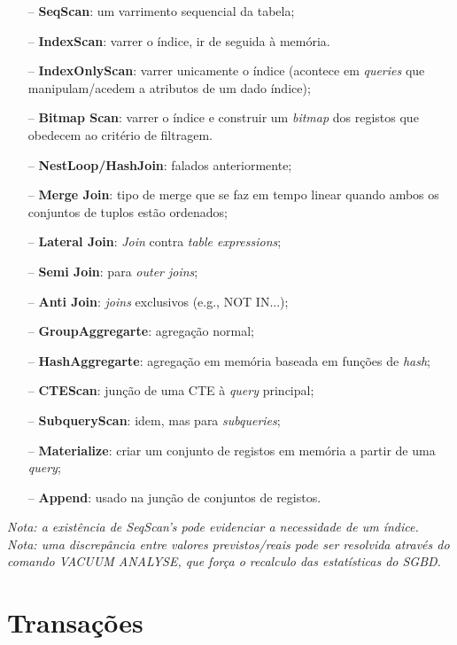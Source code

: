 \documentclass[oneside]{book}
\theoremstyle{definition}
\begin{document}
\begin{itemize}
    \itemsep0cm
    \item[--] \textbf{SeqScan}: um varrimento sequencial da tabela;
    \item[--] \textbf{IndexScan}: varrer o índice, ir de seguida à memória.
    \item[--] \textbf{IndexOnlyScan}: varrer unicamente o índice (acontece em \textit{queries} que manipulam/acedem a atributos de um dado índice);
    \item[--] \textbf{Bitmap Scan}: varrer o índice e construir um \textit{bitmap} dos registos que obedecem ao critério de filtragem.
    \item[--] \textbf{NestLoop/HashJoin}: falados anteriormente;
    \item[--] \textbf{Merge Join}: tipo de merge que se faz em tempo linear quando ambos os conjuntos de tuplos estão ordenados;
    \item[--] \textbf{Lateral Join}: \textit{Join} contra \textit{table expressions};
    \item[--] \textbf{Semi Join}: para \textit{outer joins};
    \item[--] \textbf{Anti Join}: \textit{joins} exclusivos (e.g., NOT IN...);
    \item[--] \textbf{GroupAggregarte}: agregação normal;
    \item[--] \textbf{HashAggregarte}: agregação em memória baseada em funções de \textit{hash};
    \item[--] \textbf{CTEScan}: junção de uma CTE à \textit{query} principal;
    \item[--] \textbf{SubqueryScan}: idem, mas para \textit{subqueries};
    \item[--] \textbf{Materialize}: criar um conjunto de registos em memória a partir de uma \textit{query};
    \item[--] \textbf{Append}: usado na junção de conjuntos de registos.
\end{itemize}

\textit{Nota: a existência de SeqScan's pode evidenciar a necessidade de um índice.}\\

\textit{Nota: uma discrepância entre valores previstos/reais pode ser resolvida através do comando VACUUM ANALYSE, que força o recalculo das estatísticas do SGBD.}




\chapter{Transações}
\end{document}
